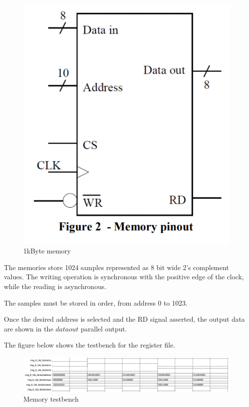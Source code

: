 \documentclass[12pt]{article}
\begin{document}
\begin{figure}[h]
	\centering
	\includegraphics[scale = 0.7]{immagini/memory.png}
	\caption{ 1kByte memory }
\end{figure}

The memories store 1024 samples represented as 8 bit wide 2's complement values.
The writing operation is synchronous with the positive edge of the clock, while the reading is asynchronous. 

The samples must be stored in order, from address 0 to 1023.

Once the desired address is selected and the RD signal asserted, the output data are shown in the $ data out $ parallel output.

The figure below shows the testbench for the register file.
\newline\newline\newline
\begin{figure}[h]
	\centering
	\includegraphics[scale = 0.47]{immagini/memory_tb.png}
	\caption{Memory testbench}
\end{figure}
\end{document}
